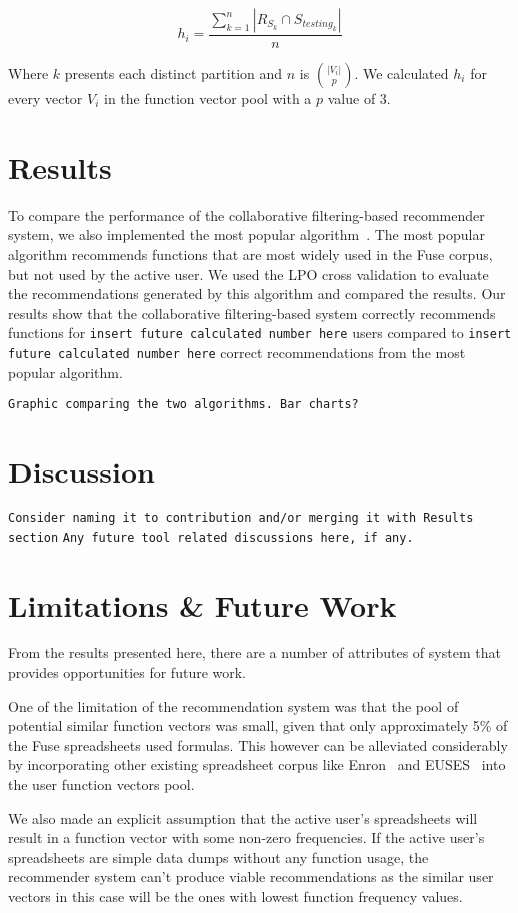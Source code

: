 \documentclass[conference]{IEEEtran}
\begin{document}
\begin{center}
	\[
	h_i = \frac{\sum\limits_{k=1}^{n} |R_{S_k} \cap S_{{testing}_k}|}{n}
	\]
\end{center}

Where $k$ presents each distinct partition and $n$ is $|V_i|\choose p$. We calculated $h_i$ for every vector $V_i$ in the function vector pool with a $p$ value of 3.

\section{Results}
To compare the performance of the collaborative filtering-based recommender system, we also implemented the most popular algorithm~\cite{linton2000owl}. The most popular algorithm recommends functions that are most widely used in the Fuse corpus, but not used by the active user. We used the LPO cross validation to evaluate the recommendations generated by this algorithm and compared the results. Our results show that the collaborative filtering-based system correctly recommends functions for \texttt{insert future calculated number here}  users compared to \texttt{insert future calculated number here} correct recommendations from the most popular algorithm.

\texttt{Graphic comparing the two algorithms. Bar charts?}

\section{Discussion}
\texttt{Consider naming it to contribution and/or merging it with Results section}
\texttt{Any future tool related discussions here, if any.}

\section{Limitations \& Future Work}
From the results presented here, there are a number of attributes of system that provides opportunities for future work.

One of the limitation of the recommendation system was that the pool of potential similar function vectors was small, given that only approximately 5\% of the Fuse spreadsheets used formulas. This however can be alleviated considerably by incorporating other existing spreadsheet corpus like Enron~\cite{hermans2014enron} and EUSES~\cite{fisher2005euses} into the user function vectors pool.

We also made an explicit assumption that the active user's spreadsheets will result in a function vector with some non-zero frequencies. If the active user's spreadsheets are simple data dumps without any function usage, the recommender system can't produce viable recommendations as the similar user vectors in this case will be the ones with lowest function frequency values.
\end{document}
